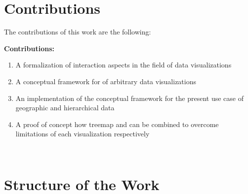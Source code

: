 \section{Contributions}


\begin{minipage}{\textwidth}
	The contributions of this work are the following: \\
	\begin{tcolorbox}
		\textbf{Contributions:}
		\begin{enumerate}
  \item A formalization of interaction aspects in the field of data visualizations
  \item A conceptual framework for \cmvs{} of arbitrary data visualizations
  \item An implementation of the conceptual framework for the present use case of geographic and hierarchical data
  \item A proof of concept how treemap and \gv{} can be combined to overcome limitations of each visualization respectively
		\end{enumerate}
	\end{tcolorbox}
\end{minipage} \\



\section{Structure of the Work}

